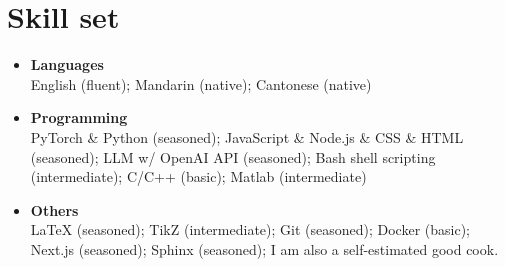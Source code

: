 \documentclass[letterpaper,11pt]{article}
\begin{document}
    \section{Skill set}

    \begin{itemize}[leftmargin=0.15in, label={}, itemsep=0em]
        \item \textbf{Languages}\\
        English (fluent); Mandarin (native); Cantonese (native)
        \item \textbf{Programming}\\
        PyTorch \& Python (seasoned); JavaScript \& Node.js \& CSS \& HTML (seasoned); LLM w/ OpenAI API (seasoned); Bash shell scripting (intermediate); C/C++ (basic); Matlab (intermediate)
        \item \textbf{Others}\\
        LaTeX (seasoned); TikZ (intermediate); Git (seasoned); Docker (basic); Next.js (seasoned); Sphinx (seasoned); I am also a self-estimated good cook.
    \end{itemize}
\end{document}

